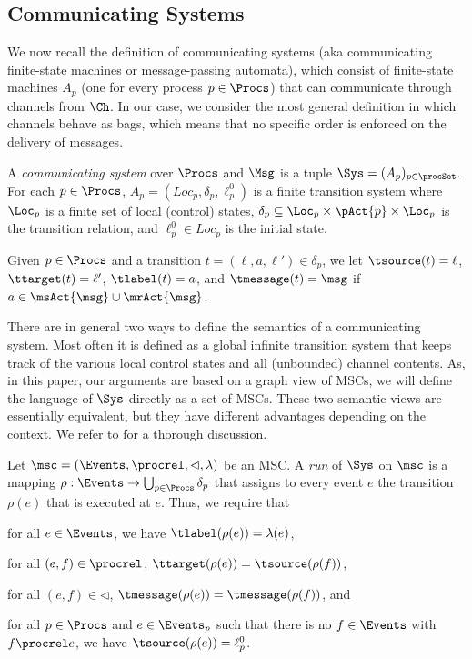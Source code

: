 

\subsection{Communicating Systems}

We now recall the definition of communicating systems (aka communicating finite-state
machines or message-passing automata), which consist of finite-state machines $A_p$
(one for every process $p \in \Procs$) that can communicate through channels from $\Ch$. In our case, we consider the most general definition in which channels behave as bags, which means that no specific order is enforced on the delivery of messages.

\begin{definition}\label{def:cs}
A \emph{communicating system} over $\Procs$ and $\Msg$ is a tuple
   $ \Sys = (A_p)_{p\in\procSet}$. For each
   $p \in \Procs$, $A_p = (Loc_p, \delta_p, \ell^0_p)$ is a finite transition system where
   $\Loc_p$ is a finite set of local (control) states, $\delta_p
   \subseteq \Loc_p \times \pAct{p} \times \Loc_p$ is the
   transition relation, and $\ell^0_p \in Loc_p$ is the initial state.
\end{definition}

Given $p \in \Procs$ and a transition $t = (\ell,a,\ell') \in \delta_p$, we let
$\tsource(t) = \ell$, $\ttarget(t) = \ell'$, $\tlabel(t) = a$, and
$\tmessage(t) = \msg$ if $a \in \msAct{\msg} \cup \mrAct{\msg}$.

\smallskip

There are in general two ways to define the semantics of a communicating system.
Most often it is defined as a global infinite transition system that keeps track
of the various local control states and all (unbounded) channel contents.
As, in this paper, our arguments are based on a graph view of MSCs, we will define
the language of $\Sys$ directly as a set of MSCs. These two semantic views are essentially
equivalent, but they have different advantages depending on the context.
We refer to \cite{CyriacG14} for a thorough discussion.

Let $\msc = (\Events,\procrel,\lhd,\lambda)$ be an MSC.
A \emph{run} of $\Sys$ on $\msc$ is a mapping
$\rho: \Events \to \bigcup_{p \in \Procs} \delta_p$
that assigns to every event $e$ the transition $\rho(e)$
that is executed at $e$. Thus, we require that
\begin{enumerate*}[label={(\roman*)}]
\item for all $e \in \Events$, we have $\tlabel(\rho(e)) = \lambda(e)$,
\item for all $(e,f) \in {\procrel}$, $\ttarget(\rho(e)) = \tsource(\rho(f))$,
\item for all $(e,f) \in {\lhd}$, $\tmessage(\rho(e)) = \tmessage(\rho(f))$,
and
\item for all $p \in \Procs$ and $e \in \Events_p$ such that there is no $f \in \Events$ with $f \procrel e$, we have $\tsource(\rho(e)) = \ell_p^0$.
\end{enumerate*}

